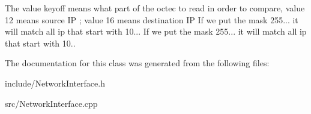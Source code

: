 The value keyoff means what part of the octec to read in order to compare, value 12 means source IP ; value 16 means destination IP If we put the mask 255... it will match all ip that start with 10... If we put the mask 255... it will match all ip that start with 10.. 

The documentation for this class was generated from the following files\+:\begin{DoxyCompactItemize}
\item 
include/Network\+Interface.\+h\item 
src/Network\+Interface.\+cpp\end{DoxyCompactItemize}
